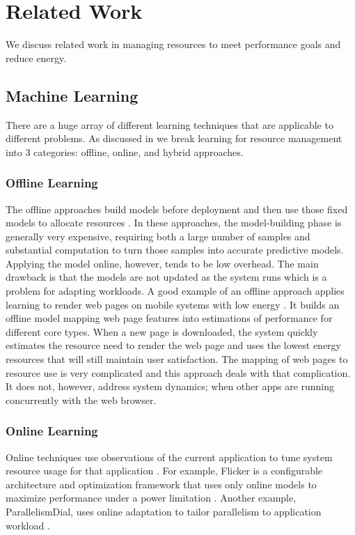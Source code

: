 \section{Related Work}

We discuss related work in managing resources to meet performance
goals and reduce energy.  

\subsection{Machine Learning}
There are a huge array of different learning techniques that are
applicable to different problems.  As discussed in 
we break learning for resource management into 3 categories:
offline, online, and hybrid approaches.  

\subsubsection{Offline Learning}
The offline approaches build models before deployment and then use
those fixed models to allocate resources
\cite{Yi2003,LeeBrooks2006,CPR,ChenJohn2011,petabricksStatic}.  In
these approaches, the model-building phase is generally very expensive,
requiring both a large number of samples and substantial computation
to turn those samples into accurate predictive models.  Applying the model online, however, tends to be low overhead.  The main drawback is that the models are not updated as the
system runs which is a problem for adapting workloads. A good example of an offline approach applies learning to render web
pages on mobile systems with low energy \cite{reddiHPCA2013}. It builds an offline model
mapping web page features into estimations of performance for
different core types.  When a new page is downloaded, the system
quickly estimates the resource need to render the web page and uses the
lowest energy resources that will still maintain user satisfaction.
The mapping of web pages to resource use is very complicated and this
approach deals with that complication.  It does not, however, address
system dynamics; \eg{} when other apps are running concurrently with the
web browser.

\subsubsection{Online Learning}
Online techniques use observations of the current application to tune
system resource usage for that application
\cite{Li2006,Flicker,ParallelismDial,Ponamarev,petabricksDynamic,LeeBrooks}.
For example, Flicker is a configurable architecture and optimization
framework that uses only online models to maximize performance under a
power limitation \cite{Flicker}.  Another example, ParallelismDial,
uses online adaptation to tailor parallelism to application workload
\cite{ParallelismDial}.



